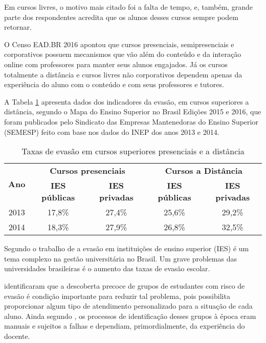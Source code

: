 Em cursos livres, o motivo mais citado foi a falta de tempo, e, também, grande
parte dos respondentes acredita que os alunos desses cursos sempre podem
retornar.

O Censo EAD.BR 2016 apontou que cursos presenciais, semipresenciais e
corporativos possuem mecanismos que vão além do conteúdo e da interação online
com professores para manter seus alunos engajados. Já os cursos totalmente a
distância e cursos livres não corporativos dependem apenas da experiência do
aluno com o conteúdo e com seus professores e tutores.

A Tabela \ref{tableEvasionTax2} apresenta dados dos indicadores da evasão, em
cursos superiores a distância, segundo o Mapa do Ensino Superior no Brasil
Edições 2015 e 2016, que foram publicados pelo Sindicato das Empresas
Mantenedoras do Ensino Superior (SEMESP) feito com base nos dados do INEP dos
anos 2013 e 2014.

\begin{table}[!htb]
  \centering
  \caption{\label{tableEvasionTax2} Taxas de evasão em cursos superiores presenciais e a distância}
  \begin{tabular}{@{}ccccc@{}}
    \toprule
    \multirow{2}{*}{\textbf{Ano}} & \multicolumn{2}{c}{\textbf{Cursos presenciais}} & \multicolumn{2}{c}{\textbf{Cursos a Distância}} \\ \cmidrule(l){2-5}
    & \textbf{IES públicas} & \textbf{IES privadas} & \textbf{IES públicas} & \textbf{IES privadas} \\ \midrule
    2013 & 17,8\% & 27,4\% & 25,6\% & 29,2\% \\
    2014 & 18,3\% & 27,9\% & 26,8\% & 32,5\% \\ \bottomrule
  \end{tabular}
\end{table}

Segundo o trabalho de  a evasão em instituições
de ensino superior (IES) é um tema complexo na gestão universitária no Brasil.
Um grave problemas das universidades brasileiras é o aumento das taxas de evasão
escolar.

 identificaram que a descoberta precoce de
grupos de estudantes com risco de evasão é condição importante para reduzir tal
problema, pois possibilita proporcionar algum tipo de atendimento personalizado
para a situação de cada aluno. Ainda segundo
, os processos de identificação desses
grupos à época eram manuais e sujeitos a falhas e dependiam, primordialmente, da
experiência do docente.

